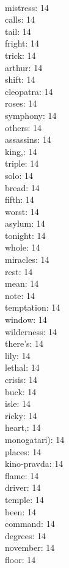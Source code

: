 \begin{multicols}{6}
  \\ mistress: 14
  \\ calls: 14
  \\ tail: 14
  \\ fright: 14
  \\ trick: 14
  \\ arthur: 14
  \\ shift: 14
  \\ cleopatra: 14
  \\ roses: 14
  \\ symphony: 14
  \\ others: 14
  \\ assassins: 14
  \\ king,: 14
  \\ triple: 14
  \\ solo: 14
  \\ bread: 14
  \\ fifth: 14
  \\ worst: 14
  \\ asylum: 14
  \\ tonight: 14
  \\ whole: 14
  \\ miracles: 14
  \\ rest: 14
  \\ mean: 14
  \\ note: 14
  \\ temptation: 14
  \\ window: 14
  \\ wilderness: 14
  \\ there's: 14
  \\ lily: 14
  \\ lethal: 14
  \\ crisis: 14
  \\ buck: 14
  \\ isle: 14
  \\ ricky: 14
  \\ heart,: 14
  \\ monogatari): 14
  \\ places: 14
  \\ kino-pravda: 14
  \\ flame: 14
  \\ driver: 14
  \\ temple: 14
  \\ been: 14
  \\ command: 14
  \\ degrees: 14
  \\ november: 14
  \\ floor: 14

\end{multicols}
